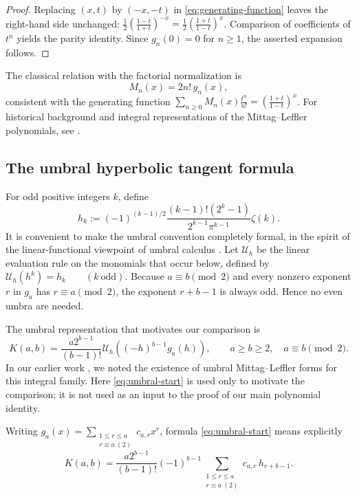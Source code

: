 \documentclass[11pt,twoside]{article}
\begin{document}
\begin{proof}
Replacing $(x,t)$ by $(-x,-t)$ in
\eqref{eq:generating-function} leaves the right-hand side unchanged:
\(\frac12\left(\frac{1-t}{1+t}\right)^{-x} =\frac12\left(\frac{1+t}{1-t}\right)^x\).
Comparison of coefficients of $t^n$ yields the parity identity.  Since
$g_n(0)=0$ for $n\ge1$, the asserted expansion follows.
\end{proof}

The classical relation with the factorial normalization is
\begin{equation}
\label{eq:M-g-relation}
M_n(x)=2n!\,g_n(x),
\end{equation}
consistent with the generating function
\(\sum_{n\ge0}M_n(x)\frac{t^n}{n!} =\left(\frac{1+t}{1-t}\right)^x\).
For historical background and integral representations of the
Mittag--Leffler polynomials, see \cite{Bateman1940}.

\subsection{The umbral hyperbolic tangent formula}

For odd positive integers $k$, define
\begin{equation}
\label{eq:hk-definition}
 h_k
 :=(-1)^{(k-1)/2}
 \frac{(k-1)!(2^k-1)}{2^{k-1}\pi^{k-1}}\zeta(k).
\end{equation}
It is convenient to make the umbral convention completely formal, in the
spirit of the linear-functional viewpoint of umbral calculus
\cite{Roman1984}.  Let $\mathcal U_h$ be the linear evaluation rule on
the monomials that occur below, defined by
\(\mathcal U_h(h^k)=h_k \qquad(k\ \text{odd})\).
Because $a\equiv b\pmod2$ and every nonzero exponent $r$ in $g_a$ has
$r\equiv a\pmod2$, the exponent $r+b-1$ is always odd.  Hence no even
umbra are needed.

The umbral representation that motivates our comparison is
\begin{equation}
\label{eq:umbral-start}
K(a,b)
=\frac{a2^{b-1}}{(b-1)!}
\mathcal U_h\!\left((-h)^{b-1}g_a(h)\right),
\qquad a\ge b\ge2,
\quad a\equiv b\pmod2.
\end{equation}
In our earlier work \cite[Remark~4.7]{TallaWaffo2026}, we noted the
existence of umbral Mittag--Leffler forms for this integral family.  Here
\eqref{eq:umbral-start} is used only to motivate the comparison; it is not
used as an input to the proof of our main polynomial identity.

Writing
\(g_a(x)= \sum_{\substack{1\le r\le a\\r\equiv a\ (2)}}c_{a,r}x^r\),
formula \eqref{eq:umbral-start} means explicitly
\begin{equation}
\label{eq:umbral-expanded}
K(a,b)
=\frac{a2^{b-1}}{(b-1)!}(-1)^{b-1}
\sum_{\substack{1\le r\le a\\r\equiv a\ (2)}}
 c_{a,r}\,h_{r+b-1}.
\end{equation}
\end{document}
